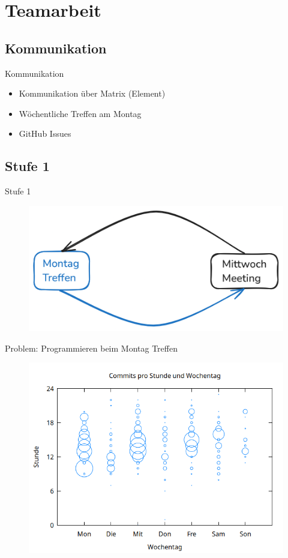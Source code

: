 \section{Teamarbeit}

\subsection{Kommunikation}
\begin{frame}{Kommunikation}
    \begin{itemize}
        \item Kommunikation über Matrix (Element)
        \item Wöchentliche Treffen am Montag
        \item GitHub Issues
    \end{itemize}
\end{frame}

\subsection{Stufe 1}
\begin{frame}{Stufe 1}
    \begin{figure}
        \centering
        \includegraphics[width=0.6\linewidth]{pictures/level1}
        \label{fig:lvl1}
    \end{figure}
\end{frame}

\begin{frame}{Problem: Programmieren beim Montag Treffen}
\begin{figure}
    \centering
    \includegraphics[width=0.52\linewidth]{pictures/hours}
    \label{fig:commit-hours}
\end{figure}
\end{frame}

